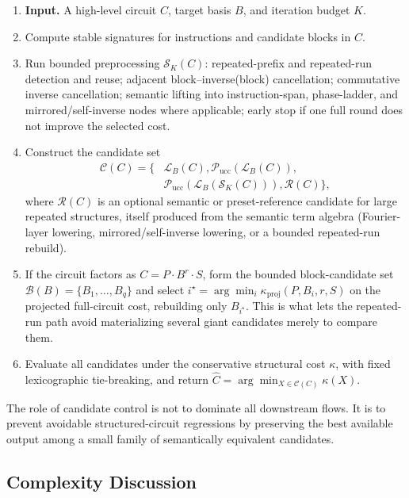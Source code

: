 \begin{enumerate}[leftmargin=1.8em]
    \item \textbf{Input.} A high-level circuit $C$, target basis $B$, and iteration budget $K$.
    \item Compute stable signatures for instructions and candidate blocks in $C$.
    \item Run bounded preprocessing $\mathcal{S}_K(C)$: repeated-prefix
    and repeated-run detection and reuse; adjacent
    block--inverse(block) cancellation; commutative inverse
    cancellation; semantic lifting into instruction-span, phase-ladder,
    and mirrored/self-inverse nodes where applicable; early stop if one
    full round does not improve the selected cost.
    \item Construct the candidate set
    \[
    \begin{aligned}
    \mathcal{C}(C) = \{&\mathcal{L}_B(C),
    \mathcal{P}_{\mathrm{ucc}}(\mathcal{L}_B(C)),\\
    &\mathcal{P}_{\mathrm{ucc}}(\mathcal{L}_B(\mathcal{S}_K(C))),
    \mathcal{R}(C)\},
    \end{aligned}
    \]
    where $\mathcal{R}(C)$ is an optional semantic or preset-reference
    candidate for large repeated structures, itself produced from the
    semantic term algebra (Fourier-layer lowering, mirrored/self-inverse
    lowering, or a bounded repeated-run rebuild).
    \item If the circuit factors as $C=P\cdot B^r\cdot S$, form the
    bounded block-candidate set $\mathcal{B}(B)=\{B_1,\dots,B_q\}$ and
    select $i^\star=\arg\min_i\kappa_{\mathrm{proj}}(P,B_i,r,S)$ on the
    projected full-circuit cost, rebuilding only $B_{i^\star}$.  This is
    what lets the repeated-run path avoid materializing several giant
    candidates merely to compare them.
    \item Evaluate all candidates under the conservative structural cost
    $\kappa$, with fixed lexicographic tie-breaking, and return
    $\widehat{C}=\arg\min_{X\in\mathcal{C}(C)}\kappa(X)$.
\end{enumerate}

The role of candidate control is not to dominate all downstream flows.
It is to prevent avoidable structured-circuit regressions by preserving
the best available output among a small family of semantically
equivalent candidates.


\subsection{Complexity Discussion}

